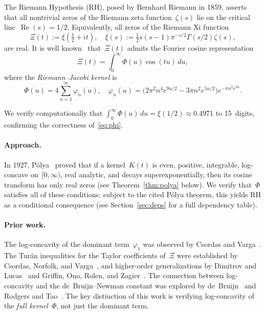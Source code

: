\documentclass[11pt]{article}
\theoremstyle{definition}
\theoremstyle{remark}
\begin{document}
The Riemann Hypothesis (RH), posed by Bernhard Riemann in 1859, asserts that all nontrivial zeros of the Riemann zeta function~$\zeta(s)$ lie on the critical line~$\operatorname{Re}(s) = 1/2$. Equivalently, all zeros of the Riemann Xi function
\begin{equation}\label{eq:xi}
\Xi(t) := \xi\!\left(\tfrac{1}{2} + it\right), \quad \xi(s) := \tfrac{1}{2}s(s-1)\pi^{-s/2}\Gamma(s/2)\zeta(s),
\end{equation}
are real. It is well known~\cite{titchmarsh1986} that~$\Xi(t)$ admits the Fourier cosine representation
\begin{equation}\label{eq:fourier}
\Xi(t) = \int_0^\infty \Phi(u)\cos(tu)\,du,
\end{equation}
where the \emph{Riemann--Jacobi kernel} is
\begin{equation}\label{eq:phi}
\Phi(u) = 4\sum_{n=1}^{\infty}\varphi_n(u), \quad \varphi_n(u) = \bigl(2\pi^2 n^4 e^{9u/2} - 3\pi n^2 e^{5u/2}\bigr)e^{-\pi n^2 e^{2u}}.
\end{equation}

We verify computationally that $\int_0^\infty \Phi(u)\,du = \xi(1/2) \approx 0.4971$ to 15~digits, confirming the correctness of~\eqref{eq:phi}.

\paragraph{Approach.} In 1927, P\'olya~\cite{polya1927} proved that if a kernel~$K(t)$ is even, positive, integrable, log-concave on~$[0,\infty)$, real analytic, and decays superexponentially, then its cosine transform has only real zeros (see Theorem~\ref{thm:polya} below). We verify that~$\Phi$ satisfies all of these conditions; subject to the cited P\'olya theorem, this yields RH as a conditional consequence (see Section~\ref{sec:deps} for a full dependency table).

\paragraph{Prior work.} The log-concavity of the dominant term~$\varphi_1$ was observed by Csordas and Varga~\cite{csordas1989}. The Tur\'an inequalities for the Taylor coefficients of~$\Xi$ were established by Csordas, Norfolk, and Varga~\cite{csordas1986}, and higher-order generalizations by Dimitrov and Lucas~\cite{dimitrov2011} and Griffin, Ono, Rolen, and Zagier~\cite{griffin2019}. The connection between log-concavity and the de~Bruijn--Newman constant was explored by de~Bruijn~\cite{debruijn1950} and Rodgers and Tao~\cite{rodgers2020}. The key distinction of this work is verifying log-concavity of the \emph{full kernel}~$\Phi$, not just the dominant term.
\end{document}
